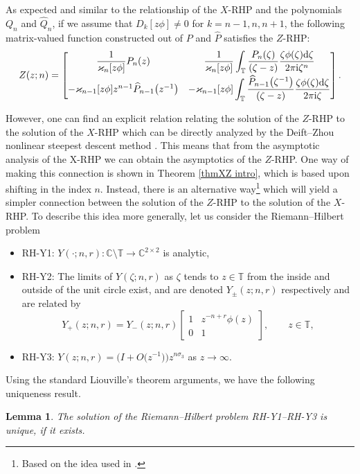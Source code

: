 \documentclass[10pt,a4paper]{amsart}
\numberwithin{equation}{section}
\newtheorem{Lemma}[Theorem]{Lemma}
 { \theoremstyle{definition}
\newtheorem{Definition}[Theorem]{Definition}
\newtheorem{Example}[Theorem]{Example}
\newtheorem{Remark}[Theorem]{Remark}
\newtheorem{Question}[Theorem]{Question}
}
\newcommand{\C}{{\mathbb C}}
\newcommand{\T}{{\mathbb T}}
\newcommand{\ze}{\zeta}
\newcommand{\di}{\displaystyle}
\newcommand{\ii}{{\rm i}}
\newcommand{\dd}{{\rm d}}
\begin{document}
	
	
	
	
	
	As expected and similar to the relationship of the $X$-RHP and the polynomials $Q_n$ and $\widehat{Q}_n$, if we assume that $D_k[z\phi] \neq 0$ for $k=n-1, n, n+1$, the following matrix-valued function constructed out of $P$ and $\widehat{P}$ satisfies the $Z$-RHP:
	\begin{equation}\label{Toeplitz-OP-solution zphi}
		Z(z;n)=\begin{bmatrix}
			\di	\frac{1}{\varkappa_n[z\phi]} P_n(z) & \di \frac{1}{\varkappa_n[z\phi]} \int_{\T} \frac{P_n(\ze)}{(\ze-z)} \frac{\ze \phi(\ze)\dd \ze}{2\pi \ii \ze^n} \\[8pt]
			-\varkappa_{n-1}[z\phi]z^{n-1}\widehat{P}_{n-1}\big(z^{-1}\big) & \di -\varkappa_{n-1}[z\phi] \int_{\T} \frac{\widehat{P}_{n-1}\big(\ze^{-1}\big)}{(\ze-z)} \frac{\ze \phi(\ze)\dd \ze}{2\pi \ii \ze}
		\end{bmatrix}.
	\end{equation}
	
However, one can find an explicit relation relating the solution of the $Z$-RHP to the solution of the $X$-RHP which can be directly analyzed by the Deift--Zhou nonlinear steepest descent method \cite{DZ}. This means that from the asymptotic analysis of the X-RHP we can obtain the asymptotics of the $Z$-RHP. One way of making this connection is shown in Theorem \ref{thmXZ intro}, which is based upon shifting in the index $n$. Instead, there is an alternative way\footnote{Based on the idea used in \cite{GI2}.} which will yield a simpler connection between the solution of the $Z$-RHP to the solution of the $X$-RHP. To describe this idea more generally, let us consider the Riemann--Hilbert problem
	\begin{itemize}\itemsep=0pt
		\item RH-Y1: %
$Y(\cdot;n,r)\colon\C\setminus \T \to \C^{2\times2}$ is analytic,
		\item RH-Y2: %
The limits of $Y(\ze;n,r)$ as $\ze$ tends to $z \in \T $ from the inside and outside of the unit circle exist, and are denoted $Y_{\pm}(z;n,r)$ respectively and are related by
		\[
			Y_+(z;n,r)=Y_-(z;n,r)\begin{bmatrix}
				1 & z^{-n+r}\phi(z) \\
				0 & 1
			\end{bmatrix}, \qquad z \in \T,
		\]
		
		\item RH-Y3: %
$Y(z;n,r)=\big( I + O\big(z^{-1}\big) \big) z^{n \sigma_3}$ as $z \to \infty$.
	\end{itemize}
	Using the standard Liouville's theorem arguments, we have the following uniqueness result.
	\begin{Lemma}\label{uniqueness Y}
		The solution of the Riemann--Hilbert problem {\rm RH-Y1}--{\rm RH-Y3} is unique, if it exists.
	\end{Lemma}
	
\end{document}
